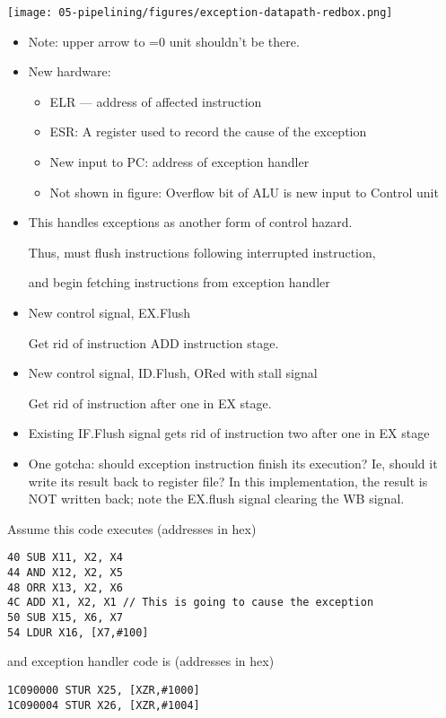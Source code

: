 \begin{frame}[fragile]
 {\texttt{[image: 05-pipelining/figures/exception-datapath-redbox.png]}}
\BNotes\ifnum{}
\begin{itemize}
	\item Note: upper arrow to =0 unit shouldn't be there.
	\item New hardware:
	\begin{itemize}
		\item ELR --- address of affected instruction

		\item ESR: A register used to record the cause of the
			exception
		\item New input to PC: address of exception handler
		\item Not shown in figure: Overflow bit of ALU
			is new input to Control unit
	\end{itemize}
	\item This handles exceptions as another form of control hazard.

		Thus, must flush instructions following interrupted
		instruction, 

		and begin fetching instructions from
		exception handler
	\item New control signal, EX.Flush

		Get rid of instruction ADD instruction
		stage.
	\item New control signal, ID.Flush, ORed with stall signal

		Get rid of instruction after one in EX stage.
	\item Existing IF.Flush signal gets rid of instruction two after one in EX stage
	\item One gotcha: should exception instruction finish its
		execution?  Ie, should it write its result back to
		register file?  In this implementation, the result
		is NOT written back; note the EX.flush signal clearing
		the WB signal.
		
\end{itemize}
\fi\ENotes
\end{frame}


\begin{frame}[fragile]
Assume this code executes (addresses in hex)
\begin{verbatim}
40 SUB X11, X2, X4
44 AND X12, X2, X5
48 ORR X13, X2, X6
4C ADD X1, X2, X1 // This is going to cause the exception
50 SUB X15, X6, X7
54 LDUR X16, [X7,#100]
\end{verbatim}
and exception handler code is (addresses in hex)
\begin{verbatim}
1C090000 STUR X25, [XZR,#1000]
1C090004 STUR X26, [XZR,#1004]
\end{verbatim}
\BNotes\ifnum{}
~
\fi\ENotes
\end{frame}

